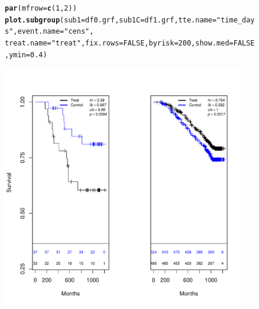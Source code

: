 \documentclass[9pt]{article}\usepackage[]{graphicx}\usepackage[]{xcolor}
\makeatletter
\newcommand{\hlnum}[1]{\textcolor[rgb]{0.686,0.059,0.569}{#1}}%
\newcommand{\hlstr}[1]{\textcolor[rgb]{0.192,0.494,0.8}{#1}}%
\newcommand{\hlstd}[1]{\textcolor[rgb]{0.345,0.345,0.345}{#1}}%
\newcommand{\hlkwc}[1]{\textcolor[rgb]{0.333,0.667,0.333}{#1}}%
\newcommand{\hlkwd}[1]{\textcolor[rgb]{0.737,0.353,0.396}{\textbf{#1}}}%
\newenvironment{kframe}{%
 \def\at@end@of@kframe{}%
 \ifinner\ifhmode%
  \def\at@end@of@kframe{\end{minipage}}%
  \begin{minipage}{\columnwidth}%
 \fi\fi%
 \def\FrameCommand##1{\hskip\@totalleftmargin \hskip-\fboxsep
 \colorbox{shadecolor}{##1}\hskip-\fboxsep
     \hskip-\linewidth \hskip-\@totalleftmargin \hskip\columnwidth}%
 \MakeFramed {\advance\hsize-\width
   \@totalleftmargin\z@ \linewidth\hsize
   \@setminipage}}%
 {\par\unskip\endMakeFramed%
 \at@end@of@kframe}
\newenvironment{knitrout}{}{} %
\theoremstyle{definition}
\theoremstyle{remark}
\makeatother
\begin{document}

\begin{figure}[h!]
\begin{center}
\begin{knitrout}
\color{fgcolor}\begin{kframe}
\begin{alltt}
\hlkwd{par}\hlstd{(}\hlkwc{mfrow} \hlstd{=} \hlkwd{c}\hlstd{(}\hlnum{1}\hlstd{,} \hlnum{2}\hlstd{))}
\hlkwd{plot.subgroup}\hlstd{(}\hlkwc{sub1} \hlstd{= df0.grf,} \hlkwc{sub1C} \hlstd{= df1.grf,} \hlkwc{tte.name} \hlstd{=} \hlstr{"time_days"}\hlstd{,} \hlkwc{event.name} \hlstd{=} \hlstr{"cens"}\hlstd{,}
    \hlkwc{treat.name} \hlstd{=} \hlstr{"treat"}\hlstd{,} \hlkwc{fix.rows} \hlstd{=} \hlnum{FALSE}\hlstd{,} \hlkwc{byrisk} \hlstd{=} \hlnum{200}\hlstd{,} \hlkwc{show.med} \hlstd{=} \hlnum{FALSE}\hlstd{,} \hlkwc{ymin} \hlstd{=} \hlnum{0.4}\hlstd{)}
\end{alltt}
\end{kframe}
\includegraphics[width=400px,height=400px]{figure/grf_sg-1} 
\end{knitrout}
\end{center}
\end{figure}
\end{document}
